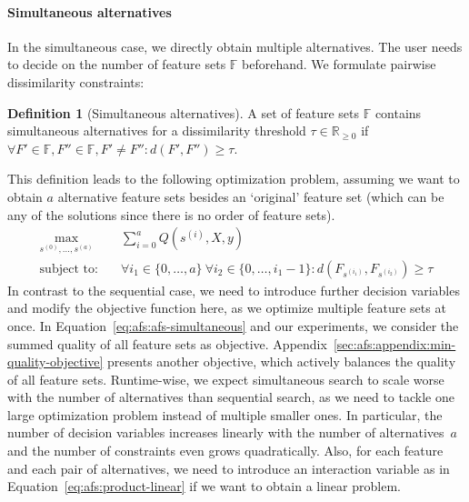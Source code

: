 \documentclass{article}
\theoremstyle{definition}
\newtheorem{definition}{Definition}
\begin{document}
\paragraph{Simultaneous alternatives}

In the simultaneous case, we directly obtain multiple alternatives.
The user needs to decide on the number of feature sets $\mathbb{F}$ beforehand.
We formulate pairwise dissimilarity constraints:
%
\begin{definition}[Simultaneous alternatives]
	A set of feature sets $\mathbb{F}$ contains simultaneous alternatives for a dissimilarity threshold $\tau \in \mathbb{R}_{\geq 0}$ if $\forall F' \in \mathbb{F}, F'' \in \mathbb{F}, F' \neq F'': d(F',F'') \geq \tau$.
	\label{def:afs:simultaneous-alternative}
\end{definition}
%
This definition leads to the following optimization problem, assuming we want to obtain $a$ alternative feature sets besides an `original' feature set (which can be any of the solutions since there is no order of feature sets).
%
\begin{equation}
	\begin{aligned}
		\max_{s^{(0)}, \dots, s^{(a)}} &\quad \sum_{i=0}^a Q(s^{(i)},X,y) \\
		\text{subject to:} &\quad \forall i_1 \in \{0, \dots, a\}~\forall i_2 \in \{0, \dots, i_1-1\} : d(F_{s^{(i_1)}},F_{s^{(i_2)}}) \geq \tau
	\end{aligned}
	\label{eq:afs:afs-simultaneous}
\end{equation}
%
In contrast to the sequential case, we need to introduce further decision variables and modify the objective function here, as we optimize multiple feature sets at once.
In Equation~\ref{eq:afs:afs-simultaneous} and our experiments, we consider the summed quality of all feature sets as objective.
Appendix~\ref{sec:afs:appendix:min-quality-objective} presents another objective, which actively balances the quality of all feature sets.
Runtime-wise, we expect simultaneous search to scale worse with the number of alternatives than sequential search, as we need to tackle one large optimization problem instead of multiple smaller ones.
In particular, the number of decision variables increases linearly with the number of alternatives~$a$ and the number of constraints even grows quadratically.
Also, for each feature and each pair of alternatives, we need to introduce an interaction variable as in Equation~\ref{eq:afs:product-linear} if we want to obtain a linear problem.
\end{document}
